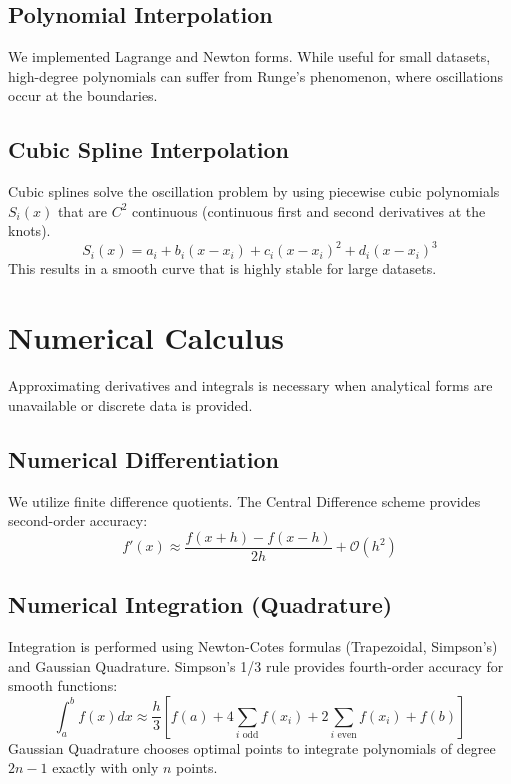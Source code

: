 \documentclass[11pt,a4paper]{article}
\begin{document}
\subsection{Polynomial Interpolation}
We implemented Lagrange and Newton forms. While useful for small datasets, high-degree polynomials can suffer from Runge's phenomenon, where oscillations occur at the boundaries.

\subsection{Cubic Spline Interpolation}
Cubic splines solve the oscillation problem by using piecewise cubic polynomials $S_i(x)$ that are $C^2$ continuous (continuous first and second derivatives at the knots).
\begin{equation}
    S_i(x) = a_i + b_i(x-x_i) + c_i(x-x_i)^2 + d_i(x-x_i)^3
\end{equation}
This results in a smooth curve that is highly stable for large datasets.

\section{Numerical Calculus}
Approximating derivatives and integrals is necessary when analytical forms are unavailable or discrete data is provided.

\subsection{Numerical Differentiation}
We utilize finite difference quotients. The Central Difference scheme provides second-order accuracy:
\begin{equation}
    f'(x) \approx \frac{f(x+h) - f(x-h)}{2h} + \mathcal{O}(h^2)
\end{equation}

\subsection{Numerical Integration (Quadrature)}
Integration is performed using Newton-Cotes formulas (Trapezoidal, Simpson's) and Gaussian Quadrature. Simpson's 1/3 rule provides fourth-order accuracy for smooth functions:
\begin{equation}
    \int_a^b f(x) dx \approx \frac{h}{3} \left[ f(a) + 4 \sum_{i \text{ odd}} f(x_i) + 2 \sum_{i \text{ even}} f(x_i) + f(b) \right]
\end{equation}
Gaussian Quadrature chooses optimal points to integrate polynomials of degree $2n-1$ exactly with only $n$ points.
\end{document}
